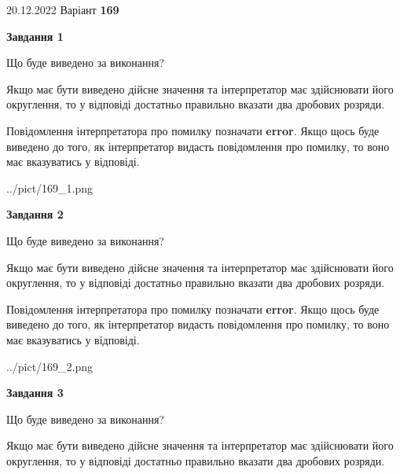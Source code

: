 \documentclass[12pt, ukrainian]{article}
\begin{document}
{20.12.2022 Варіант \No \textbf { 169 }\par}
{
\begin {Large}

{\begin {center}\textbf{Завдання 1}\end {center}}\par
Що буде виведено за виконання? \par

Якщо має бути виведено дійсне значення та інтерпретатор має здійснювати його округлення, 
то у відповіді достатньо правильно вказати два дробових розряди.

Повідомлення інтерпретатора про помилку позначати \textbf{error}.
Якщо щось буде виведено до того, як інтерпретатор видасть повідомлення про помилку, 
то воно має вказуватись у відповіді. \par

\begin{center}
	{../pict/169_1.png}
\end{center}
\newpage

{\begin {center}\textbf{Завдання 2}\end {center}}\par
Що буде виведено за виконання? \par

Якщо має бути виведено дійсне значення та інтерпретатор має здійснювати його округлення, 
то у відповіді достатньо правильно вказати два дробових розряди.

Повідомлення інтерпретатора про помилку позначати \textbf{error}.
Якщо щось буде виведено до того, як інтерпретатор видасть повідомлення про помилку, 
то воно має вказуватись у відповіді. \par

\begin{center}
	{../pict/169_2.png}
\end{center}
\newpage

{\begin {center}\textbf{Завдання 3}\end {center}}\par
Що буде виведено за виконання? \par

Якщо має бути виведено дійсне значення та інтерпретатор має здійснювати його округлення, 
то у відповіді достатньо правильно вказати два дробових розряди.


\end{Large}}
\end{document}
